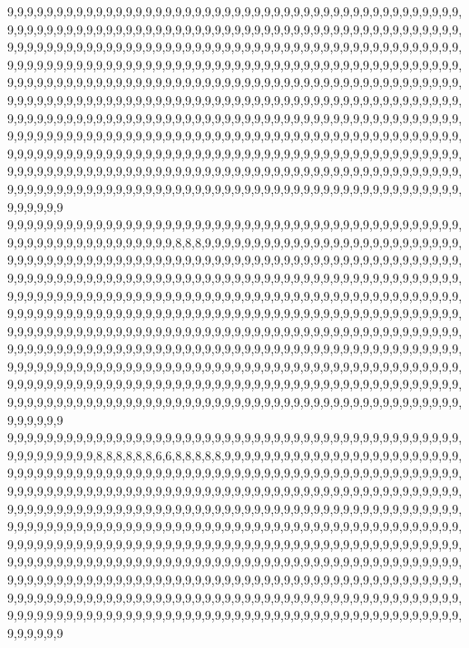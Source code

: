 9,9,9,9,9,9,9,9,9,9,9,9,9,9,9,9,9,9,9,9,9,9,9,9,9,9,9,9,9,9,9,9,9,9,9,9,9,9,9,9,9,9,9,9,9,9,9,9,9,9,9,9,9,9,9,9,9,9,9,9,9,9,9,9,9,9,9,9,9,9,9,9,9,9,9,9,9,9,9,9,9,9,9,9,9,9,9,9,9,9,9,9,9,9,9,9,9,9,9,9,9,9,9,9,9,9,9,9,9,9,9,9,9,9,9,9,9,9,9,9,9,9,9,9,9,9,9,9,9,9,9,9,9,9,9,9,9,9,9,9,9,9,9,9,9,9,9,9,9,9,9,9,9,9,9,9,9,9,9,9,9,9,9,9,9,9,9,9,9,9,9,9,9,9,9,9,9,9,9,9,9,9,9,9,9,9,9,9,9,9,9,9,9,9,9,9,9,9,9,9,9,9,9,9,9,9,9,9,9,9,9,9,9,9,9,9,9,9,9,9,9,9,9,9,9,9,9,9,9,9,9,9,9,9,9,9,9,9,9,9,9,9,9,9,9,9,9,9,9,9,9,9,9,9,9,9,9,9,9,9,9,9,9,9,9,9,9,9,9,9,9,9,9,9,9,9,9,9,9,9,9,9,9,9,9,9,9,9,9,9,9,9,9,9,9,9,9,9,9,9,9,9,9,9,9,9,9,9,9,9,9,9,9,9,9,9,9,9,9,9,9,9,9,9,9,9,9,9,9,9,9,9,9,9,9,9,9,9,9,9,9,9,9,9,9,9,9,9,9,9,9,9,9,9,9,9,9,9,9,9,9,9,9,9,9,9,9,9,9,9,9,9,9,9,9,9,9,9,9,9,9,9,9,9,9,9,9,9,9,9,9,9,9,9,9,9,9,9,9,9,9,9,9,9,9,9,9,9,9,9,9,9,9,9,9,9,9,9,9,9,9,9,9,9,9,9,9,9,9,9,9,9,9,9,9,9,9,9,9,9,9,9,9,9,9,9,9,9,9,9,9,9,9,9,9,9,9,9,9,9,9,9,9,9,9,9,9,9,9,9,9,9,9,9,9,9,9,9,9,9,9,9,9,9,9,9,9,9,9,9,9,9,9,9,9,9,9,9,9,9,9,9,9,9,9,9,9,9,9,9,9,9
9,9,9,9,9,9,9,9,9,9,9,9,9,9,9,9,9,9,9,9,9,9,9,9,9,9,9,9,9,9,9,9,9,9,9,9,9,9,9,9,9,9,9,9,9,9,9,9,9,9,9,9,9,9,9,9,9,9,9,9,9,9,9,8,8,8,9,9,9,9,9,9,9,9,9,9,9,9,9,9,9,9,9,9,9,9,9,9,9,9,9,9,9,9,9,9,9,9,9,9,9,9,9,9,9,9,9,9,9,9,9,9,9,9,9,9,9,9,9,9,9,9,9,9,9,9,9,9,9,9,9,9,9,9,9,9,9,9,9,9,9,9,9,9,9,9,9,9,9,9,9,9,9,9,9,9,9,9,9,9,9,9,9,9,9,9,9,9,9,9,9,9,9,9,9,9,9,9,9,9,9,9,9,9,9,9,9,9,9,9,9,9,9,9,9,9,9,9,9,9,9,9,9,9,9,9,9,9,9,9,9,9,9,9,9,9,9,9,9,9,9,9,9,9,9,9,9,9,9,9,9,9,9,9,9,9,9,9,9,9,9,9,9,9,9,9,9,9,9,9,9,9,9,9,9,9,9,9,9,9,9,9,9,9,9,9,9,9,9,9,9,9,9,9,9,9,9,9,9,9,9,9,9,9,9,9,9,9,9,9,9,9,9,9,9,9,9,9,9,9,9,9,9,9,9,9,9,9,9,9,9,9,9,9,9,9,9,9,9,9,9,9,9,9,9,9,9,9,9,9,9,9,9,9,9,9,9,9,9,9,9,9,9,9,9,9,9,9,9,9,9,9,9,9,9,9,9,9,9,9,9,9,9,9,9,9,9,9,9,9,9,9,9,9,9,9,9,9,9,9,9,9,9,9,9,9,9,9,9,9,9,9,9,9,9,9,9,9,9,9,9,9,9,9,9,9,9,9,9,9,9,9,9,9,9,9,9,9,9,9,9,9,9,9,9,9,9,9,9,9,9,9,9,9,9,9,9,9,9,9,9,9,9,9,9,9,9,9,9,9,9,9,9,9,9,9,9,9,9,9,9,9,9,9,9,9,9,9,9,9,9,9,9,9,9,9,9,9,9,9,9,9,9,9,9,9,9,9,9,9,9,9,9,9,9,9,9,9,9,9,9,9,9,9,9,9,9,9,9,9,9,9
9,9,9,9,9,9,9,9,9,9,9,9,9,9,9,9,9,9,9,9,9,9,9,9,9,9,9,9,9,9,9,9,9,9,9,9,9,9,9,9,9,9,9,9,9,9,9,9,9,9,9,9,9,9,9,8,8,8,8,8,8,6,6,8,8,8,8,8,9,9,9,9,9,9,9,9,9,9,9,9,9,9,9,9,9,9,9,9,9,9,9,9,9,9,9,9,9,9,9,9,9,9,9,9,9,9,9,9,9,9,9,9,9,9,9,9,9,9,9,9,9,9,9,9,9,9,9,9,9,9,9,9,9,9,9,9,9,9,9,9,9,9,9,9,9,9,9,9,9,9,9,9,9,9,9,9,9,9,9,9,9,9,9,9,9,9,9,9,9,9,9,9,9,9,9,9,9,9,9,9,9,9,9,9,9,9,9,9,9,9,9,9,9,9,9,9,9,9,9,9,9,9,9,9,9,9,9,9,9,9,9,9,9,9,9,9,9,9,9,9,9,9,9,9,9,9,9,9,9,9,9,9,9,9,9,9,9,9,9,9,9,9,9,9,9,9,9,9,9,9,9,9,9,9,9,9,9,9,9,9,9,9,9,9,9,9,9,9,9,9,9,9,9,9,9,9,9,9,9,9,9,9,9,9,9,9,9,9,9,9,9,9,9,9,9,9,9,9,9,9,9,9,9,9,9,9,9,9,9,9,9,9,9,9,9,9,9,9,9,9,9,9,9,9,9,9,9,9,9,9,9,9,9,9,9,9,9,9,9,9,9,9,9,9,9,9,9,9,9,9,9,9,9,9,9,9,9,9,9,9,9,9,9,9,9,9,9,9,9,9,9,9,9,9,9,9,9,9,9,9,9,9,9,9,9,9,9,9,9,9,9,9,9,9,9,9,9,9,9,9,9,9,9,9,9,9,9,9,9,9,9,9,9,9,9,9,9,9,9,9,9,9,9,9,9,9,9,9,9,9,9,9,9,9,9,9,9,9,9,9,9,9,9,9,9,9,9,9,9,9,9,9,9,9,9,9,9,9,9,9,9,9,9,9,9,9,9,9,9,9,9,9,9,9,9,9,9,9,9,9,9,9,9,9,9,9,9,9,9,9,9,9,9,9,9,9,9,9,9,9,9,9,9,9,9,9,9,9,9,9,9,9
